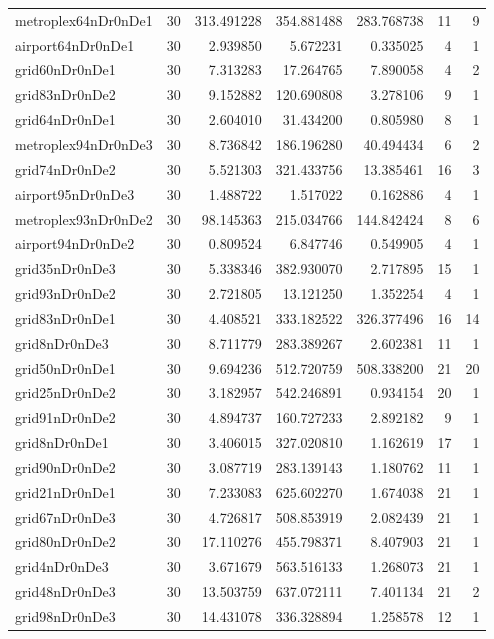 \documentclass[../../../thesis.tex]{subfiles}
\begin{document}
\begin{longtable}{|l|r|r|r|r|r|r|}
metroplex64nDr0nDe1 & 30 & 313.491228 & 354.881488 & 283.768738 & 11 & 9 \\
airport64nDr0nDe1 & 30 & 2.939850 & 5.672231 & 0.335025 & 4 & 1 \\
grid60nDr0nDe1 & 30 & 7.313283 & 17.264765 & 7.890058 & 4 & 2 \\
grid83nDr0nDe2 & 30 & 9.152882 & 120.690808 & 3.278106 & 9 & 1 \\
grid64nDr0nDe1 & 30 & 2.604010 & 31.434200 & 0.805980 & 8 & 1 \\
metroplex94nDr0nDe3 & 30 & 8.736842 & 186.196280 & 40.494434 & 6 & 2 \\
grid74nDr0nDe2 & 30 & 5.521303 & 321.433756 & 13.385461 & 16 & 3 \\
airport95nDr0nDe3 & 30 & 1.488722 & 1.517022 & 0.162886 & 4 & 1 \\
metroplex93nDr0nDe2 & 30 & 98.145363 & 215.034766 & 144.842424 & 8 & 6 \\
airport94nDr0nDe2 & 30 & 0.809524 & 6.847746 & 0.549905 & 4 & 1 \\
grid35nDr0nDe3 & 30 & 5.338346 & 382.930070 & 2.717895 & 15 & 1 \\
grid93nDr0nDe2 & 30 & 2.721805 & 13.121250 & 1.352254 & 4 & 1 \\
grid83nDr0nDe1 & 30 & 4.408521 & 333.182522 & 326.377496 & 16 & 14 \\
grid8nDr0nDe3 & 30 & 8.711779 & 283.389267 & 2.602381 & 11 & 1 \\
grid50nDr0nDe1 & 30 & 9.694236 & 512.720759 & 508.338200 & 21 & 20 \\
grid25nDr0nDe2 & 30 & 3.182957 & 542.246891 & 0.934154 & 20 & 1 \\
grid91nDr0nDe2 & 30 & 4.894737 & 160.727233 & 2.892182 & 9 & 1 \\
grid8nDr0nDe1 & 30 & 3.406015 & 327.020810 & 1.162619 & 17 & 1 \\
grid90nDr0nDe2 & 30 & 3.087719 & 283.139143 & 1.180762 & 11 & 1 \\
grid21nDr0nDe1 & 30 & 7.233083 & 625.602270 & 1.674038 & 21 & 1 \\
grid67nDr0nDe3 & 30 & 4.726817 & 508.853919 & 2.082439 & 21 & 1 \\
grid80nDr0nDe2 & 30 & 17.110276 & 455.798371 & 8.407903 & 21 & 1 \\
grid4nDr0nDe3 & 30 & 3.671679 & 563.516133 & 1.268073 & 21 & 1 \\
grid48nDr0nDe3 & 30 & 13.503759 & 637.072111 & 7.401134 & 21 & 2 \\
grid98nDr0nDe3 & 30 & 14.431078 & 336.328894 & 1.258578 & 12 & 1 \\

\end{longtable}
\end{document}
